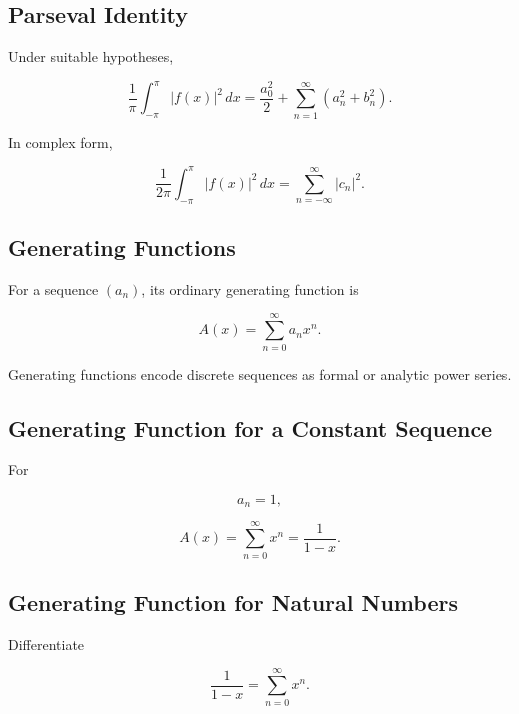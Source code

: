 \subsection{Parseval Identity}
\label{subsec:parseval-series-reference}

Under suitable hypotheses,

\[
\boxed{
\frac1\pi
\int_{-\pi}^{\pi}
|f(x)|^2
\,dx
=
\frac{a_0^2}{2}
+
\sum_{n=1}^{\infty}
(a_n^2+b_n^2).
}
\]

In complex form,

\[
\boxed{
\frac{1}{2\pi}
\int_{-\pi}^{\pi}
|f(x)|^2
\,dx
=
\sum_{n=-\infty}^{\infty}
|c_n|^2.
}
\]

\subsection{Generating Functions}
\label{subsec:generating-functions-reference}

For a sequence \((a_n)\), its ordinary generating function is

\[
\boxed{
A(x)
=
\sum_{n=0}^{\infty}
a_nx^n.
}
\]

Generating functions encode discrete sequences as formal or analytic power
series.

\subsection{Generating Function for a Constant Sequence}
\label{subsec:generating-function-constant-sequence}

For

\[
a_n=1,
\]

\[
\boxed{
A(x)
=
\sum_{n=0}^{\infty}
x^n
=
\frac{1}{1-x}.
}
\]

\subsection{Generating Function for Natural Numbers}
\label{subsec:generating-function-natural-numbers}

Differentiate

\[
\frac{1}{1-x}
=
\sum_{n=0}^{\infty}x^n.
\]

